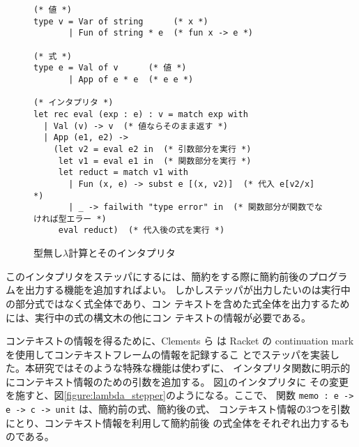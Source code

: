 \begin{figure}
\begin{verbatim}
(* 値 *)
type v = Var of string      (* x *)
       | Fun of string * e  (* fun x -> e *)

(* 式 *)
type e = Val of v      (* 値 *)
       | App of e * e  (* e e *)

(* インタプリタ *)
let rec eval (exp : e) : v = match exp with
  | Val (v) -> v  (* 値ならそのまま返す *)
  | App (e1, e2) ->
    (let v2 = eval e2 in  (* 引数部分を実行 *)
     let v1 = eval e1 in  (* 関数部分を実行 *)
     let reduct = match v1 with
       | Fun (x, e) -> subst e [(x, v2)]  (* 代入 e[v2/x] *)
       | _ -> failwith "type error" in  (* 関数部分が関数でなければ型エラー *)
     eval reduct)  (* 代入後の式を実行 *)
\end{verbatim}
\caption{型無し$\lambda$計算とそのインタプリタ}
\label{figure:lambda}
\end{figure}

このインタプリタをステッパにするには、簡約をする際に簡約前後のプログラ
ムを出力する機能を追加すればよい。
しかしステッパが出力したいのは実行中の部分式ではなく式全体であり、コン
テキストを含めた式全体を出力するためには、実行中の式の構文木の他にコン
テキストの情報が必要である。


コンテキストの情報を得るために、Clements ら\cite{clements01} は Racket
の continuation mark を使用してコンテキストフレームの情報を記録するこ
とでステッパを実装した。本研究ではそのような特殊な機能は使わずに、
インタプリタ関数に明示的にコンテキスト情報のための引数を追加する。
図\ref{figure:lambda}のインタプリタに
その変更を施すと、図\ref{figure:lambda_stepper}のようになる。ここで、
関数 \texttt{memo :\ e -> e -> c -> unit} は、簡約前の式、簡約後の式、
コンテキスト情報の3つを引数にとり、コンテキスト情報を利用して簡約前後
の式全体をそれぞれ出力するものである。


